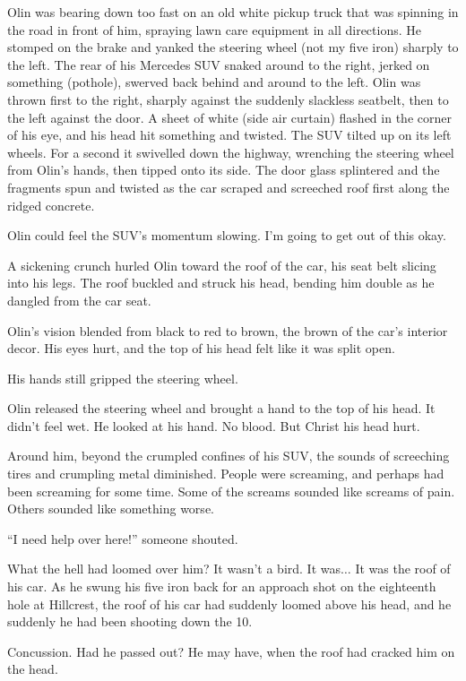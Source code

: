 Olin was bearing down too fast on an old white pickup truck that was spinning in the road in front of him, spraying lawn care equipment in all directions. He stomped on the brake and yanked the steering wheel (not my five iron) sharply to the left. The rear of his Mercedes SUV snaked around to the right, jerked on something (pothole), swerved back behind and around to the left. Olin was thrown first to the right, sharply against the suddenly slackless seatbelt, then to the left against the door. A sheet of white (side air curtain) flashed in the corner of his eye, and his head hit something and twisted. The SUV tilted up on its left wheels. For a second it swivelled down the highway, wrenching the steering wheel from Olin's hands, then tipped onto its side. The door glass splintered and the fragments spun and twisted as the car scraped and screeched roof first along the ridged concrete.

Olin could feel the SUV's momentum slowing. I'm going to get out of this okay.

A sickening crunch hurled Olin toward the roof of the car, his seat belt slicing into his legs. The roof buckled and struck his head, bending him double as he dangled from the car seat.

Olin's vision blended from black to red to brown, the brown of the car's interior decor. His eyes hurt, and the top of his head felt like it was split open.

His hands still gripped the steering wheel.

Olin released the steering wheel and brought a hand to the top of his head. It didn't feel wet. He looked at his hand. No blood. But Christ his head hurt.

Around him, beyond the crumpled confines of his SUV, the sounds of screeching tires and crumpling metal diminished. People were screaming, and perhaps had been screaming for some time. Some of the screams sounded like screams of pain. Others sounded like something worse.

``I need help over here!'' someone shouted.

What the hell had loomed over him? It wasn't a bird. It was$\ldots$ It was the roof of his car. As he swung his five iron back for an approach shot on the eighteenth hole at Hillcrest, the roof of his car had suddenly loomed above his head, and he suddenly he had been shooting down the 10.

Concussion. Had he passed out? He may have, when the roof had cracked him on the head.

